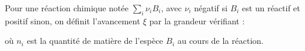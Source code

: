 ﻿\documentclass[a4paper]{article}
\begin{document}
\pagestyle{fancy}
\fancyhf{}
\setlength{\headheight}{15pt}

\begin{center}
	\large{}
\end{center}


Pour une réaction chimique notée \(\sum_i\nu_iB_i\), avec \(\nu_i\) négatif si \(B_i\) est un réactif et positif sinon, on définit l'avancement \(\xi\) par la grandeur vérifiant :
\begin{center}
\end{center}
où \(n_i\) est la quantité de matière de l'espèce \(B_i\) au cours de la réaction.
\end{document}
